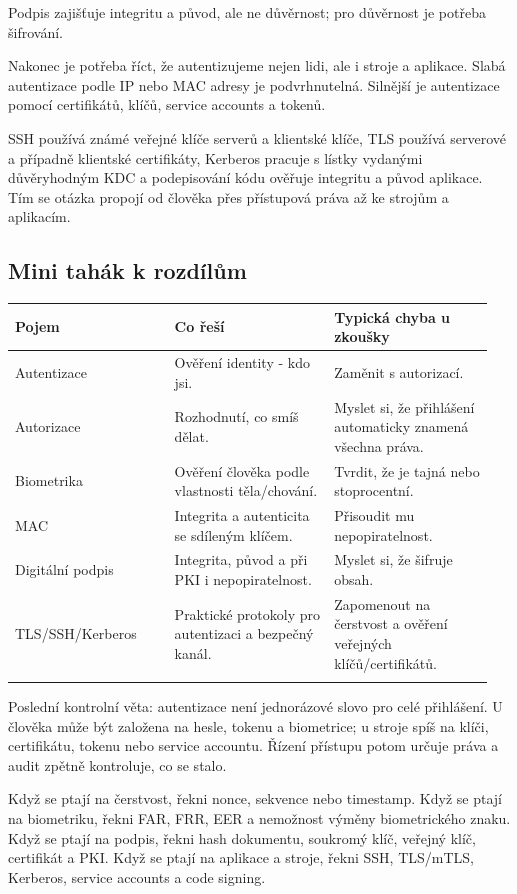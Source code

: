Podpis zajišťuje integritu a původ, ale ne důvěrnost; pro důvěrnost je potřeba šifrování.

Nakonec je potřeba říct, že autentizujeme nejen lidi, ale i stroje a aplikace. Slabá autentizace podle IP nebo MAC adresy je podvrhnutelná. Silnější je autentizace pomocí certifikátů, klíčů, service accounts a tokenů.

SSH používá známé veřejné klíče serverů a klientské klíče, TLS používá serverové a případně klientské certifikáty, Kerberos pracuje s lístky vydanými důvěryhodným KDC a podepisování kódu ověřuje integritu a původ aplikace. Tím se otázka propojí od člověka přes přístupová práva až ke strojům a aplikacím.

\subsection*{Mini tahák k rozdílům}

\begin{longtable}{p{0.317\linewidth}p{0.317\linewidth}p{0.317\linewidth}}
\toprule
\textbf{Pojem} & \textbf{Co řeší} & \textbf{Typická chyba u zkoušky} \\
\midrule\endhead
Autentizace & Ověření identity - kdo jsi. & Zaměnit s autorizací. \\
\addlinespace
Autorizace & Rozhodnutí, co smíš dělat. & Myslet si, že přihlášení automaticky znamená všechna práva. \\
\addlinespace
Biometrika & Ověření člověka podle vlastnosti těla/chování. & Tvrdit, že je tajná nebo stoprocentní. \\
\addlinespace
MAC & Integrita a autenticita se sdíleným klíčem. & Přisoudit mu nepopiratelnost. \\
\addlinespace
Digitální podpis & Integrita, původ a při PKI i nepopiratelnost. & Myslet si, že šifruje obsah. \\
\addlinespace
TLS/SSH/Kerberos & Praktické protokoly pro autentizaci a bezpečný kanál. & Zapomenout na čerstvost a ověření veřejných klíčů/certifikátů. \\
\addlinespace
\bottomrule
\end{longtable}

Poslední kontrolní věta: autentizace není jednorázové slovo pro celé přihlášení. U člověka může být založena na hesle, tokenu a biometrice; u stroje spíš na klíči, certifikátu, tokenu nebo service accountu. Řízení přístupu potom určuje práva a audit zpětně kontroluje, co se stalo.

Když se ptají na čerstvost, řekni nonce, sekvence nebo timestamp. Když se ptají na biometriku, řekni FAR, FRR, EER a nemožnost výměny biometrického znaku. Když se ptají na podpis, řekni hash dokumentu, soukromý klíč, veřejný klíč, certifikát a PKI. Když se ptají na aplikace a stroje, řekni SSH, TLS/mTLS, Kerberos, service accounts a code signing.

\newpage

